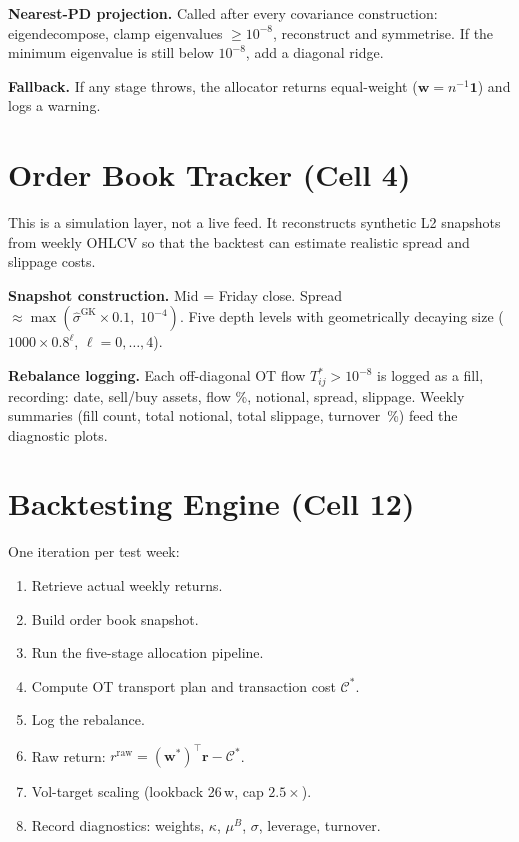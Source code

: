 \documentclass[11pt]{article}
\begin{document}
\textbf{Nearest-PD projection.}
Called after every covariance construction:
eigendecompose, clamp eigenvalues $\ge 10^{-8}$, reconstruct and symmetrise.
If the minimum eigenvalue is still below $10^{-8}$, add a diagonal ridge.

\textbf{Fallback.}
If any stage throws, the allocator returns equal-weight
($\bm{w}=n^{-1}\bm{1}$) and logs a warning.

\section{Order Book Tracker (Cell 4)}\label{sec:ob}

This is a simulation layer, not a live feed.  It reconstructs synthetic
L2 snapshots from weekly OHLCV so that the backtest can estimate
realistic spread and slippage costs.

\textbf{Snapshot construction.}
Mid = Friday close.
Spread $\approx \max(\hat\sigma^{\mathrm{GK}}\times 0.1,\;10^{-4})$.
Five depth levels with geometrically decaying size
($1000\times 0.8^\ell$, $\ell=0,\dots,4$).

\textbf{Rebalance logging.}
Each off-diagonal OT flow $T_{ij}^*>10^{-8}$ is logged as a fill,
recording: date, sell/buy assets, flow \%, notional, spread, slippage.
Weekly summaries (fill count, total notional, total slippage, turnover~\%)
feed the diagnostic plots.

\section{Backtesting Engine (Cell 12)}\label{sec:backtest}

One iteration per test week:

\begin{enumerate}
\item Retrieve actual weekly returns.
\item Build order book snapshot.
\item Run the five-stage allocation pipeline.
\item Compute OT transport plan and transaction cost $\mathcal{C}^*$.
\item Log the rebalance.
\item Raw return: $r^{\mathrm{raw}}=(\bm{w}^*)^\top\bm{r}-\mathcal{C}^*$.
\item Vol-target scaling (lookback 26\,w, cap $2.5\times$).
\item Record diagnostics: weights, $\kappa$, $\mu^B$, $\sigma$, leverage, turnover.
\end{enumerate}
\end{document}
